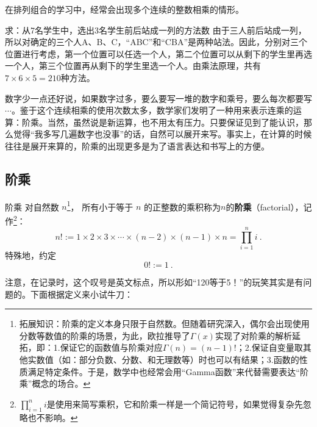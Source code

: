 

在排列组合的学习中，经常会出现多个连续的整数相乘的情形。

\begin{example}{求：从7名学生中，选出3名学生前后站成一列的方法数}\label{ex_factor_1}
由于三人前后站成一列，所以对确定的三个人A、B、C，“ABC”和“CBA”是两种站法。因此，分别对三个位置进行考虑，第一个位置可以任选一个人，第二个位置可以从剩下的学生里再选一个人，第三个位置再从剩下的学生里选一个人。由乘法原理，共有$7\times6\times5=210$种方法。
\end{example}

数字少一点还好说，如果数字过多，要么要写一堆的数字和乘号，要么每次都要写$\cdots$。鉴于这个连续相乘的使用次数太多，数学家们发明了一种用来表示连乘的运算：阶乘。当然，虽然说是新运算，也不用太有压力。只要保证见到了能认识，那么觉得“我多写几遍数字也没事”的话，自然可以展开来写。事实上，在计算的时候往往是展开来算的，阶乘的出现更多是为了语言表达和书写上的方便。

\subsection{阶乘}

\begin{definition}{阶乘}
对自然数 $n$\footnote{拓展知识：阶乘的定义本身只限于自然数。但随着研究深入，偶尔会出现使用分数等数值的阶乘的场景，为此，欧拉推导了$\Gamma(x)$实现了对阶乘的解析延拓，即：1.保证它的函数值与阶乘对应$\Gamma(n)=(n-1)!$；2.保证自变量取其他实数值（如：部分负数、分数、和无理数等）时也可以有结果；3.函数的性质满足特定条件。于是，数学中也经常会用“Gamma函数”来代替需要表达“阶乘”概念的场合。}， 所有小于等于 $n$ 的正整数的乘积称为$n$的\textbf{阶乘}（factorial），记作\footnote{$\prod_{i = 1}^n i$是使用来简写乘积，它和阶乘一样是一个简记符号，如果觉得复杂先忽略也不影响。}：
\begin{equation}
n! := 1 \times 2 \times 3 \times \cdots \times(n - 2)\times(n - 1)\times n=\prod_{i = 1}^n i ~.
\end{equation}
特殊地，约定
\begin{equation}
0! := 1~.
\end{equation}
\end{definition}

注意，在记录时，这个叹号是英文标点，所以形如“120等于5！”的玩笑其实是有问题的。下面根据定义来小试牛刀：

